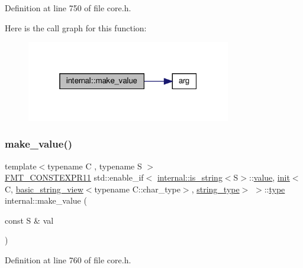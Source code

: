 Definition at line 750 of file core.\+h.

Here is the call graph for this function\+:
\nopagebreak
\begin{figure}[H]
\begin{center}
\leavevmode
\includegraphics[width=253pt]{namespaceinternal_a79837815bee11b56f801442c7e5b2742_cgraph}
\end{center}
\end{figure}
\mbox{\label{namespaceinternal_a3762125b750d86d353134984d7049419}} 
\subsubsection{\texorpdfstring{make\+\_\+value()}{make\_value()}\hspace{0.1cm}{\footnotesize\ttfamily [8/8]}}
{\footnotesize\ttfamily template$<$typename C , typename S $>$ \\
\hyperlink{core_8h_a056f29fbe3ea234ac0cc417fb866a189}{F\+M\+T\+\_\+\+C\+O\+N\+S\+T\+E\+X\+P\+R11} std\+::enable\+\_\+if$<$ \hyperlink{structinternal_1_1is__string}{internal\+::is\+\_\+string}$<$S$>$\+::\hyperlink{classinternal_1_1value}{value}, \hyperlink{structinternal_1_1init}{init}$<$C, \hyperlink{classbasic__string__view}{basic\+\_\+string\+\_\+view}$<$typename C\+::char\+\_\+type$>$, \hyperlink{namespaceinternal_a8661864098ac0acff9a6dd7e66f59038a8a104d760e6ea540da0d654ca8728d55}{string\+\_\+type}$>$ $>$\+::\hyperlink{namespaceinternal_a8661864098ac0acff9a6dd7e66f59038}{type} internal\+::make\+\_\+value (\begin{DoxyParamCaption}\item[{const S \&}]{val }\end{DoxyParamCaption})}



Definition at line 760 of file core.\+h.

